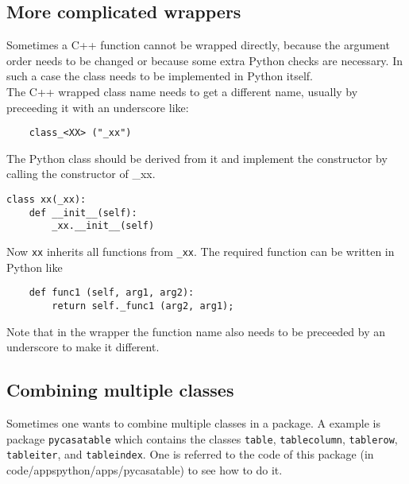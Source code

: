 \subsection{More complicated wrappers}
Sometimes a C++ function cannot be wrapped directly, because the argument
order needs to be changed or because some extra Python checks are
necessary.
In such a case the class needs to be implemented in Python itself.
\\The C++ wrapped class name needs to get a different name,
usually by preceeding it with an underscore like:
\begin{verbatim}
    class_<XX> ("_xx")
\end{verbatim}
The Python class should be derived from it and implement the
constructor by calling the constructor of \_xx.
\begin{verbatim}
class xx(_xx):
    def __init__(self):
        _xx.__init__(self)
\end{verbatim}
Now \texttt{xx} inherits all functions from \texttt{\_xx}.
The required function can be written in Python like
\begin{verbatim}
    def func1 (self, arg1, arg2):
        return self._func1 (arg2, arg1);
\end{verbatim}
Note that in the wrapper the function name also needs to be
preceeded by an underscore to make it different.

\subsection{Combining multiple classes}
Sometimes one wants to combine multiple classes in a package. A
example is package \texttt{pycasatable} which contains the classes
\texttt{table}, \texttt{tablecolumn}, \texttt{tablerow},
\texttt{tableiter}, and \texttt{tableindex}. One is referred to the
code of this package (in code/appspython/apps/pycasatable) to see how
to do it.

